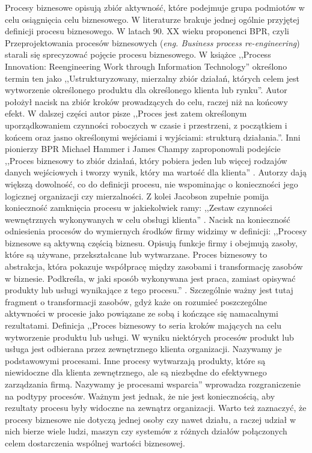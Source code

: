 Procesy biznesowe opisują zbiór aktywność, które podejmuje grupa podmiotów w celu osiągnięcia celu biznesowego. W literaturze brakuje jednej ogólnie przyjętej definicji procesu biznesowego. W latach 90. XX wieku proponenci BPR, czyli Przeprojektowania procesów biznesowych (\textit{eng. Business process re-engineering}) starali się sprecyzować pojęcie procesu biznesowego. W książce ,,Process Innovation: Reengineering Work through Information Technology'' \cite{davenport1993process} określono termin ten jako ,,Ustrukturyzowany, mierzalny zbiór działań, których celem jest wytworzenie określonego produktu dla określonego klienta lub rynku''. Autor położył nacisk na zbiór kroków prowadzących do celu, raczej niż na końcowy efekt. W dalszej części autor pisze ,,Proces jest zatem określonym uporządkowaniem czynności roboczych w czasie i przestrzeni, z początkiem i końcem oraz jasno określonymi wejściami i wyjściami: strukturą działania.''. Inni pionierzy BPR Michael Hammer i James Champy zaproponowali  podejście ,,Proces biznesowy to zbiór działań, który pobiera jeden lub więcej rodzajów danych wejściowych i tworzy wynik, który ma wartość dla klienta'' \cite{HAMMER199390}. Autorzy dają większą dowolność, co do definicji procesu, nie wspominając o konieczności jego logicznej organizacji czy mierzalności. Z kolei Jacobson zupełnie pomija konieczność zamknięcia procesu w jakiekolwiek ramy: ,,Zestaw czynności wewnętrznych wykonywanych w celu obsługi klienta'' \cite{JacobsonObjectAdvantage}. Nacisk na konieczność odniesienia procesów do wymiernych środków firmy widzimy w definicji: ,,Procesy biznesowe są aktywną częścią biznesu. Opisują funkcje firmy i obejmują zasoby, które są używane, przekształcane lub wytwarzane. Proces biznesowy to abstrakcja, która pokazuje współpracę między zasobami i transformację zasobów w biznesie. Podkreśla, w jaki sposób wykonywana jest praca, zamiast opisywać produkty lub usługi wynikające z tego procesu.'' \cite{Eriksson2000BusinessMW}. Szczególnie ważny jest tutaj fragment o transformacji zasobów, gdyż każe on rozumieć poszczególne aktywności w procesie jako powiązane ze sobą i kończące się namacalnymi rezultatami. Definicja ,,Proces biznesowy to seria kroków mających na celu wytworzenie produktu lub usługi. W wyniku niektórych procesów produkt lub usługa jest odbierana przez zewnętrznego klienta organizacji. Nazywamy je podstawowymi procesami. Inne procesy wytwarzają produkty, które są niewidoczne dla klienta zewnętrznego, ale są niezbędne do efektywnego zarządzania firmą. Nazywamy je procesami wsparcia'' \cite{rummler_brache_1995} wprowadza rozgraniczenie na podtypy procesów. Ważnym jest jednak, że nie jest koniecznością, aby rezultaty procesu były widoczne na zewnątrz organizacji. Warto też zaznaczyć, że procesy biznesowe nie dotyczą jednej osoby czy nawet działu, a raczej udział w nich bierze wiele ludzi, maszyn czy systemów z różnych działów połączonych celem dostarczenia wspólnej wartości biznesowej.

